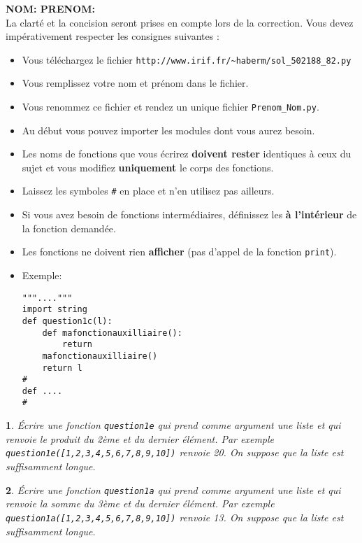 \documentclass[10pt]{article}
\newtheorem{exi}{}
\newenvironment{exo}{\begin{exi}\em}{\end{exi}}
\begin{document}
\vspace*{-1cm}

\noindent
{\bf NOM: \hspace*{5cm} PRENOM:}\\
\noindent
La clarté et la concision seront prises en compte lors de la correction.
Vous devez impérativement respecter les consignes suivantes :
\begin{itemize}
\item Vous téléchargez le fichier \verb+http://www.irif.fr/~haberm/sol_502188_82.py+
        \item Vous remplissez votre nom et prénom dans le fichier.
	\item Vous renommez ce fichier et rendez un unique fichier
              {\tt Prenom\_Nom.py}. 
        \item Au début vous pouvez importer les modules dont vous aurez besoin.
	\item Les noms de fonctions que vous écrirez {\bf doivent rester}
	  identiques à ceux du sujet et vous modifiez {\bf uniquement}
          le corps des fonctions.
          \item Laissez les symboles \verb+#+ en place
          et n'en utilisez pas ailleurs.
        \item Si vous avez besoin de fonctions intermédiaires, définissez les
{\bf à l'intérieur} de la fonction demandée.
        \item Les fonctions ne doivent rien {\bf afficher} (pas d'appel de la fonction \verb+print+).
\item Exemple:
\begin{verbatim}
"""...."""
import string
def question1c(l):
    def mafonctionauxilliaire(): 
        return
    mafonctionauxilliaire() 
    return l
#
def ....
#
\end{verbatim}
\end{itemize}
\begin{exo}
    Écrire une fonction {\tt question1e} qui prend comme argument une liste et
qui renvoie le produit du 2ème et du dernier élément. Par exemple
\verb+question1e([1,2,3,4,5,6,7,8,9,10])+ renvoie 20.
On suppose que la liste est suffisamment longue.
\end{exo}
\begin{exo}
    Écrire une fonction {\tt question1a} qui prend comme argument une liste et
qui renvoie la somme du 3ème et du dernier élément. Par exemple
\verb+question1a([1,2,3,4,5,6,7,8,9,10])+ renvoie 13.
On suppose que la liste est suffisamment longue.
\end{exo}
\end{document}
